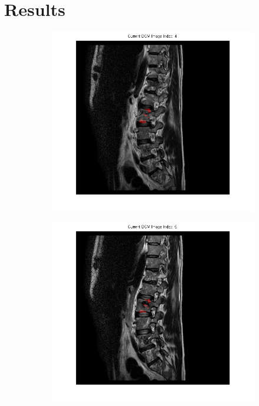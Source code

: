 \documentclass{article}
\begin{document}
  \section{Results}
  {
    \begin{figure}[h]
      \centering
      \begin{subfigure}[t]{0.15\linewidth}
        \centering
        \includegraphics[width=\linewidth,trim={6cm 3cm 6cm 0},clip]{imgs/mask04}
      \end{subfigure}
      \hfill
      \begin{subfigure}[t]{0.15\linewidth}
        \centering
        \includegraphics[width=\linewidth,trim={6cm 3cm 6cm 0},clip]{imgs/mask05}

\end{subfigure}
\end{figure}}
\end{document}
